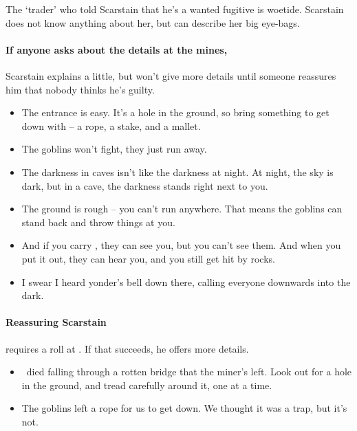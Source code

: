 \begin{multicols}{2}
The `trader' who told Scarstain that he's a wanted fugitive is \gls{woetide}.
Scarstain does not know anything about her, but can describe her big eye-bags.

\paragraph{If anyone asks about the details at the mines,}
Scarstain explains a little, but won't give more details until someone reassures him that nobody thinks he's guilty.

\begin{speechtext}
  \begin{itemize}
    \item
    The entrance is easy.
    It's a hole in the ground, so bring something to get down with -- a rope, a stake, and a mallet.
    \item
    The goblins won't fight, they just run away.
    \item
    The darkness in caves isn't like the darkness at night.
    At night, the sky is dark, but in a cave, the darkness stands right next to you.
    \item
    The ground is rough -- you can't run anywhere.
    That means the goblins can stand back and throw things at you.
    \item
    And if you carry , they can see you, but you can't see them.
    And when you put it out, they can hear you, and you still get hit by rocks.
    \item
    I swear I heard \gls{yonder}'s bell down there, calling everyone downwards into the dark.
  \end{itemize}
\end{speechtext}

\paragraph{Reassuring Scarstain}
requires a  roll at \tn[10].
If that succeeds, he offers more details.

\begin{speechtext}
  \begin{itemize}
    \item
    \composeHumanName\ died falling through a rotten bridge that the miner's left.
    Look out for a hole in the ground, and tread carefully around it, one at a time.
    
    \item
    The goblins left a rope for us to get down.
    We thought it was a trap, but it's not.
    

\end{itemize}
\end{speechtext}
\end{multicols}
